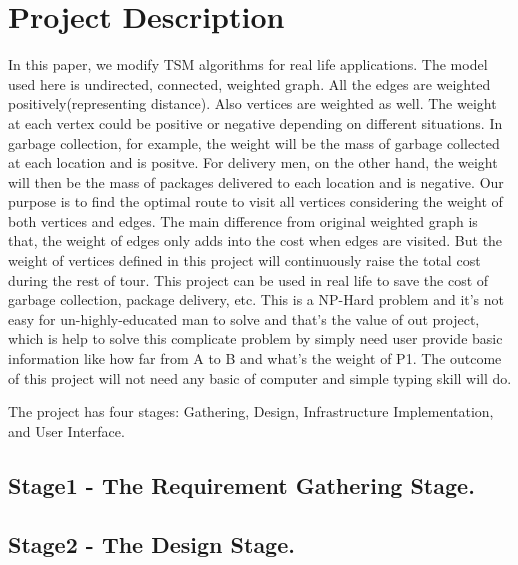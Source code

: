 \documentclass[10pt,conference]{IEEEtran}
\begin{document}
\section{Project Description}\label{sec:1. Project Description}
\textnormal{
In this paper, we modify TSM algorithms for real life applications. The model used here is undirected, connected, weighted graph. All the edges are weighted positively(representing distance). Also vertices are weighted as well. The weight at each vertex could be positive or negative depending on different situations. In garbage collection, for example, the weight will be the mass of garbage collected at each location and is positve. For delivery men, on the other hand, the weight will then be the mass of packages delivered to each location and is negative. Our purpose is to find the optimal route to visit all vertices considering the weight of both vertices and edges. The main difference from original weighted graph is that, the weight of edges only adds into the cost when edges are visited. But the weight of vertices defined in this project will continuously raise the total cost during the rest of tour. This project can be used in real life to save the cost of garbage collection, package delivery, etc. This is a NP-Hard problem and it's not easy for un-highly-educated man to solve and that's the value of out project, which is help to solve this complicate problem by simply need user provide basic information like how far from A to B and what's the weight of P1. The outcome of this project will not need any basic of computer and simple typing skill will do.
}

The project has four stages: Gathering, Design, Infrastructure Implementation, and User Interface.

%
\subsection{Stage1 - The Requirement Gathering Stage. }\label{sec:1 Requirement Gathering Stage. }


\subsection{Stage2 - The Design Stage. }\label{sec: 2:The Design Stage.}

\end{document}
